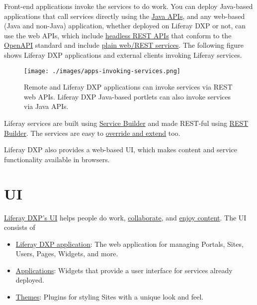 Front-end applications invoke the services to do work. You can deploy
Java-based applications that call services directly using the
\href{/docs/7-2/reference/-/knowledge_base/r/java-apis}{Java APIs}, and
any web-based (Java and non-Java) application, whether deployed on
Liferay DXP or not, can use the web APIs, which include
\href{/docs/7-2/appdev/-/knowledge_base/a/generating-apis-with-rest-builder}{headless
REST APIs} that conform to the
\href{https://swagger.io/docs/specification/about/}{OpenAPI} standard
and include
\href{/docs/7-2/frameworks/-/knowledge_base/f/web-services}{plain
web/REST services}. The following figure shows Liferay DXP applications
and external clients invoking Liferay services.

\begin{figure}
\centering
\texttt{[image: ./images/apps-invoking-services.png]}
\caption{Remote and Liferay DXP applications can invoke services via
REST web APIs. Liferay DXP Java-based portlets can also invoke services
via Java APIs.}
\end{figure}

Liferay services are built using
\href{/docs/7-2/appdev/-/knowledge_base/a/service-builder}{Service
Builder} and made REST-ful using
\href{/docs/7-2/appdev/-/knowledge_base/a/rest-builder}{REST Builder}.
The services are easy to
\href{/docs/7-2/customization/-/knowledge_base/c/overriding-osgi-services}{override
and extend} too.

Liferay DXP also provides a web-based UI, which makes content and
service functionality available in browsers.

\section{UI}\label{ui}

\href{/docs/7-2/user/-/knowledge_base/u/the-liferay-distinction}{Liferay
DXP's UI} helps people do work,
\href{/docs/7-2/user/-/knowledge_base/u/collaboration}{collaborate}, and
\href{/docs/7-2/user/-/knowledge_base/u/web-experience-management}{enjoy
content}. The UI consists of

\begin{itemize}
\item
  \href{/docs/7-2/user/-/knowledge_base/u/the-liferay-distinction}{Liferay
  DXP application}: The web application for managing Portals, Sites,
  Users, Pages, Widgets, and more.
\item
  \href{/docs/7-2/appdev/-/knowledge_base/a/application-development}{Applications}:
  Widgets that provide a user interface for services already deployed.
\item
  \href{/docs/7-2/frameworks/-/knowledge_base/f/themes-introduction}{Themes}:
  Plugins for styling Sites with a unique look and feel.
\end{itemize}

